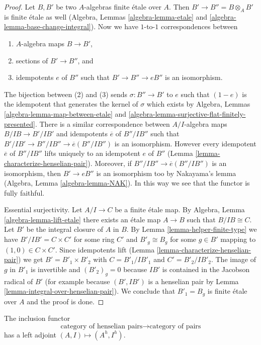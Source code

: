 \begin{proof}
Let $B, B'$ be two $A$-algebras finite \'etale over $A$.
Then $B' \to B'' = B \otimes_A B'$ is finite \'etale as well
(Algebra, Lemmas \ref{algebra-lemma-etale} and
\ref{algebra-lemma-base-change-integral}).
Now we have $1$-to-$1$ correspondences between
\begin{enumerate}
\item $A$-algebra maps $B \to B'$,
\item sections of $B' \to B''$, and
\item idempotents $e$ of $B''$ such that $B' \to B'' \to eB''$ is
an isomorphism.
\end{enumerate}
The bijection between (2) and (3) sends $\sigma : B'' \to B'$
to $e$ such that $(1 - e)$ is the idempotent
that generates the kernel of $\sigma$ which exists by
Algebra, Lemmas \ref{algebra-lemma-map-between-etale} and
\ref{algebra-lemma-surjective-flat-finitely-presented}.
There is a similar correspondence between
$A/I$-algebra maps $B/IB \to B'/IB'$ and idempotents
$\overline{e}$ of $B''/IB''$ such that
$B'/IB' \to B''/IB'' \to \overline{e}(B''/IB'')$ is
an isomorphism. However every idempotent $\overline{e}$ of $B''/IB''$
lifts uniquely to an idempotent $e$ of $B''$
(Lemma \ref{lemma-characterize-henselian-pair}).
Moreover, if $B''/IB'' \to \overline{e}(B''/IB'')$ is an isomorphism,
then $B' \to eB''$ is an isomorphism too by Nakayama's lemma
(Algebra, Lemma \ref{algebra-lemma-NAK}).
In this way we see that the functor is fully faithful.

\medskip\noindent
Essential surjectivity. Let $A/I \to C$ be a finite \'etale map.
By Algebra, Lemma \ref{algebra-lemma-lift-etale}
there exists an \'etale map $A \to B$ such that $B/IB \cong C$.
Let $B'$ be the integral closure of $A$ in $B$. 
By Lemma \ref{lemma-helper-finite-type} we have
$B'/IB' = C \times C'$ for some ring $C'$
and $B'_g \cong B_g$ for some $g \in B'$ mapping to $(1, 0) \in C \times C'$.
Since idempotents lift
(Lemma \ref{lemma-characterize-henselian-pair})
we get $B' = B'_1 \times B'_2$ with $C = B'_1/IB'_1$ and $C' = B'_2/IB'_2$.
The image of $g$ in $B'_1$ is invertible and $(B'_2)_g = 0$
because $IB'$ is contained in the Jacobson radical of $B'$
(for example because $(B', IB')$ is a henselian pair by
Lemma \ref{lemma-integral-over-henselian-pair}).
We conclude that $B'_1 = B_g$ is finite \'etale over $A$
and the proof is done.
\end{proof}

\begin{lemma}
\label{lemma-henselization}
The inclusion functor
$$
\text{category of henselian pairs}
\longrightarrow
\text{category of pairs}
$$
has a left adjoint $(A, I) \mapsto (A^h, I^h)$.
\end{lemma}

